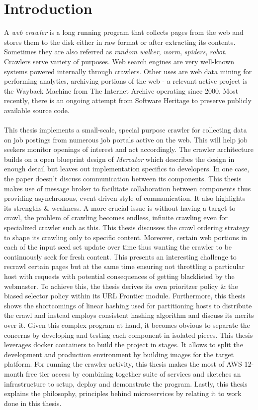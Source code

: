 \chapter{Introduction}
A \textit{web crawler} is a long running program that collects pages from the web and stores them to the
disk either in raw format or after extracting its contents. Sometimes they are also referred as
\textit{random walker}, \textit{worm}, \textit{spiders}, \textit{robot}. Crawlers serve variety of
purposes. Web search engines are very well-known systems powered internally through crawlers.
Other uses are web data mining for performing analytics, archiving portions of the web - a
relevant active project is the Wayback Machine from The Internet Archive\cite{netarchive} operating since 2000. Most recently,
there is an ongoing attempt from Software Heritage\cite{swheritage} to preserve publicly available
source code.
\\
\\
This thesis implements a small-scale, special purpose crawler for collecting data on job postings from
numerous job portals active on the web. This will help job seekers monitor openings of interest and
act accordingly. The crawler architecture builds on a open blueprint design of \textit{Mercator}\cite{mercator} which describes the design in enough detail but leaves out implementation specifics to developers. In
one case, the paper doesn't discuss communication between its components. This thesis makes use of message
broker to facilitate collaboration between components thus providing asynchronous, event-driven style of
communication. It also highlights its strengths \& weakness. A more crucial issue is without having a target to crawl, the problem of crawling becomes endless, infinite crawling even for specialized crawler such as this. This thesis discusses the crawl ordering strategy to shape its crawling only to specific content. Moreover, certain web portions in each of the input seed set update over time thus wanting the crawler to be continuously seek for fresh content. This presents an interesting challenge to recrawl certain pages but at the same time ensuring not throttling a particular host with requests with potential consequences of getting blacklisted by the webmaster. To achieve this, the thesis derives its own prioritzer policy \& the biased selector policy within its URL Frontier module. Furthermore, this thesis shows the shortcomings of linear hashing used for partitioning hosts to distribute the crawl and instead employs consistent hashing\cite{consisthash} algorithm and discuss its merits over it. Given this complex program at hand, it becomes
obvious to separate the concerns by developing and testing each component in isolated pieces. This thesis leverages docker containers to build the project in stages. It allows to split the development and production environment by building images for the target platform. For running the crawler activity, this thesis
makes the most of AWS 12-month free tier access by combining together suite of services and sketches an infrastructure to setup, deploy and demonstrate the program. Lastly, this thesis explains the philosophy, principles behind microservices\cite{microservices} by relating it to work done in this thesis.


